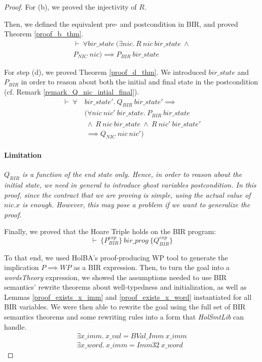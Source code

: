 \documentclass[10pt,a4paper]{article}
\newcommand{\htriple}[3]{\ensuremath{\{#1\}~#2~\{#3\}}}
\begin{document}
\begin{multicols}{2}
\begin{proof}
For (b), we proved the injectivity of $R$.

Then, we defined the equivalent pre- and postcondition in BIR, and proved Theorem \ref{proof_b_thm}.
%
\begin{equation} \label{proof_b_thm}
  \begin{split}
  \vdash~\forall bir\_state~(\exists nic.~R~nic~bir\_state~\land\\
  P_{NIC}~nic) \implies P_{BIR}~bir\_state
  \end{split}
\end{equation}

For step (d), we proved Theorem \ref{proof_d_thm}. We introduced $bir\_state$ and $P_{BIR}$ in order to reason about both the initial and final state in the postcondition (cf. Remark \ref{remark_Q_nic_intial_final}).
%
\begin{equation} \label{proof_d_thm}
\begin{split}
\vdash~\forall~&bir\_state'.~Q_{BIR}~bir\_state' \implies\\
	&(\forall nic~nic'~bir\_state.~P_{BIR}~bir\_state\\
	&~\land~R~nic~bir\_state~\land~R~nic'~bir\_state'\\
	&~\implies Q_{NIC}~nic~nic')
\end{split}
\end{equation}
\paragraph{Limitation} \textit{$Q_{BIR}$ is a function of the end state only. Hence, in order to reason about the initial state, we need in general to introduce ghost variables postcondition. In this proof, since the contract that we are proving is simple, using the actual value of $nic.x$ is enough. However, this may pose a problem if we want to generalize the proof.}
\medskip

Finally, we proved that the Hoare Triple holds on the BIR program:
%
\begin{equation} \label{proof_ht_thm}
\vdash~\htriple{P^{exp}_{BIR}}{bir\_prog}{Q^{exp}_{BIR}}
\end{equation}

To that end, we used HolBA's proof-producing WP tool to generate the implication $P \implies WP$ as a BIR expression. Then, to turn the goal into a \textit{wordsTheory} expression, we showed the assumptions needed to use BIR semantics' rewrite theorems about well-typedness and initialization, as well as Lemmas \ref{proof_exists_x_imm} and \ref{proof_exists_x_word} instantiated for all BIR variables. We were then able to rewrite the goal using the full set of BIR semantics theorems and some rewriting rules into a form that \textit{HolSmtLib} can handle.
%
\begin{align}
  \label{proof_exists_x_imm}
  \exists x\_imm.~x\_val = BVal\_Imm~x\_imm\\
  \label{proof_exists_x_word}
  \exists x\_word.~x\_imm = Imm32~x\_word
\end{align}


\end{proof}
\end{multicols}
\end{document}
